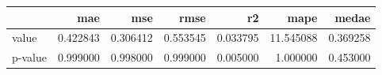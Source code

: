 \begin{tabular}{lrrrrrr}
\toprule
 & mae & mse & rmse & r2 & mape & medae \\
\midrule
value & 0.422843 & 0.306412 & 0.553545 & 0.033795 & 11.545088 & 0.369258 \\
p-value & 0.999000 & 0.998000 & 0.999000 & 0.005000 & 1.000000 & 0.453000 \\
\bottomrule
\end{tabular}
